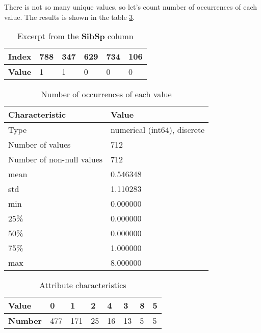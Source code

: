 There is not so many unique values, so let's count number of occurrences 
of each value. The results is shown in the table \ref{table:sibsp_value_counts}.

\begin{table}[!ht]
    \centering
    \caption{Excerpt from the \textbf{SibSp} column}
    \begin{tabular}{|l|l|l|l|l|l|}
        \hline
        \textbf{Index} & 788 & 347 & 629 & 734 & 106 \\ \hline
        \textbf{Value} & 1   & 1   & 0   & 0   & 0   \\ \hline
    \end{tabular}
    \label{table:sibsp_head}
\end{table}

\begin{table}[!ht]
    \centering
    \caption{Number of occurrences of each value}
    \begin{tabular}{|l|l|}
        \hline
        \textbf{Characteristic}   & \textbf{Value}              \\ \hline
        Type                      & numerical (int64), discrete \\ \hline
        Number of values          & 712                         \\ \hline
        Number of non-null values & 712                         \\ \hline
        mean                      & 0.546348                    \\ \hline
        std                       & 1.110283                    \\ \hline
        min                       & 0.000000                    \\ \hline
        25\%                      & 0.000000                    \\ \hline
        50\%                      & 0.000000                    \\ \hline
        75\%                      & 1.000000                    \\ \hline
        max                       & 8.000000                    \\ \hline
    \end{tabular}
    \label{table:sibsp_characteristics}
\end{table}

\begin{table}[!ht]
    \centering
    \caption{Attribute characteristics}
    \begin{tabular}{|l|l|l|l|l|l|l|l|}
        \hline
        \textbf{Value}  & 0   & 1   & 2  & 4  & 3  & 8 & 5 \\ \hline
        \textbf{Number} & 477 & 171 & 25 & 16 & 13 & 5 & 5 \\ \hline
    \end{tabular}
    \label{table:sibsp_value_counts}
\end{table}

